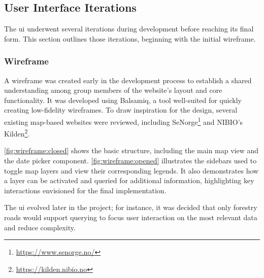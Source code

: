\subsection{User Interface Iterations} %

The \acrfull{ui} underwent several iterations during development before reaching its final form. This section outlines those iterations, beginning with the initial wireframe.

\subsubsection*{Wireframe}

A wireframe was created early in the development process to establish a shared understanding among group members of the website’s layout and core functionality. It was developed using Balsamiq, a tool well-suited for quickly creating low-fidelity wireframes. To draw inspiration for the design, several existing map-based websites were reviewed, including SeNorge\footnote{\url{https://www.senorge.no/}} and NIBIO's Kilden\footnote{\url{https://kilden.nibio.no}}.

\autoref{fig:wireframe:closed} shows the basic structure, including the main map view and the date picker component. \autoref{fig:wireframe:opened} illustrates the sidebars used to toggle map layers and view their corresponding legends. It also demonstrates how a layer can be activated and queried for additional information, highlighting key interactions envisioned for the final implementation.

The \acrshort{ui} evolved later in the project; for instance, it was decided that only forestry roads would support querying to focus user interaction on the most relevant data and reduce complexity.

